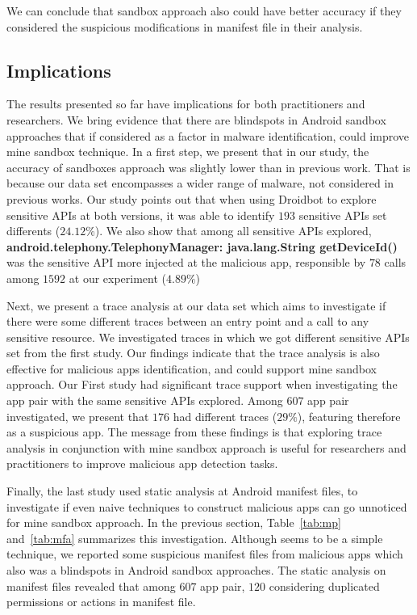 \begin{obs}{3}{}
 We can conclude that sandbox approach also could have better accuracy if they considered the suspicious modifications in manifest file in their analysis.
\end{obs}

\subsection{Implications}\label{sec:implications}

The results presented so far have implications for both practitioners and researchers. We bring evidence that there are blindspots in Android sandbox approaches that if considered as a factor in malware identification, could improve mine sandbox technique. In a first step, we present that in our study, the accuracy of sandboxes approach was slightly lower than in previous work. That is because our data set encompasses a wider range of malware, not considered in previous works. Our study points out that when using Droidbot to explore sensitive APIs at both versions, it was able to identify $193$ sensitive APIs set differents ($24.12$\%). We also show that among all sensitive APIs explored, \textbf{android.telephony.TelephonyManager: java.lang.String getDeviceId()} was the sensitive API more injected at the malicious app, responsible by $78$ calls among $1592$ at our experiment ($4.89\%$)

Next, we present a trace analysis at our data set which aims to investigate if there were some different traces between an entry point and a call to any sensitive resource. We investigated traces in which we got different sensitive APIs set from the first study. Our findings indicate that the trace analysis is also effective for malicious apps identification, and could support mine sandbox approach. Our First study had significant trace support when investigating the app pair with the same sensitive APIs explored. Among $607$ app pair investigated, we present that $176$ had different traces ($29\%$), featuring therefore as a suspicious app. The message from these findings is that exploring trace analysis in conjunction with mine sandbox approach is useful for researchers and practitioners to improve malicious app detection tasks. 

Finally, the last study used static analysis at Android manifest files, to investigate if even naive techniques to construct malicious apps can go unnoticed for mine sandbox approach. In the previous section, Table~\ref{tab:mp} and~\ref{tab:mfa} summarizes this investigation. Although seems to be a simple technique, we reported some suspicious manifest files from malicious apps which also was a blindspots in Android sandbox approaches. The static analysis on manifest files revealed that among $607$ app pair, $120$ considering duplicated permissions or actions in manifest file.

